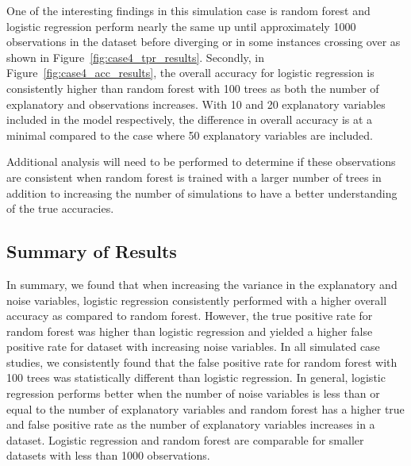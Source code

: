\documentclass{llncs}
\begin{document}
\noindent 
One of the interesting findings in this simulation case is random forest and logistic regression perform nearly the same up until approximately 1000 observations in the dataset before diverging or in some instances crossing over as shown in Figure~\ref{fig:case4_tpr_results}. Secondly, in Figure~\ref{fig:case4_acc_results}, the overall accuracy for logistic regression is consistently higher than random forest with 100 trees as both the number of explanatory and observations increases. With 10 and 20 explanatory variables included in the model respectively, the difference in overall accuracy is at a minimal compared to the case where 50 explanatory variables are included. 


\noindent 
Additional analysis will need to be performed to determine if these observations are consistent when random forest is trained with a larger number of trees in addition to increasing the number of simulations to have a better understanding of the true accuracies.

\subsection{Summary of Results}
\noindent 
In summary, we found that when increasing the variance in the explanatory and noise variables, logistic regression consistently performed with a higher overall accuracy as compared to random forest. However, the true positive rate for random forest was higher than logistic regression and yielded a higher false positive rate for dataset with increasing noise variables. In all simulated case studies, we consistently found that the false positive rate for random forest with 100 trees was statistically different than logistic regression. In general, logistic regression performs better when the number of noise variables is less than or equal to the number of explanatory variables and random forest has a higher true and false positive rate as the number of explanatory variables increases in a dataset.  Logistic regression and random forest are comparable for smaller datasets with less than 1000 observations.
\end{document}
